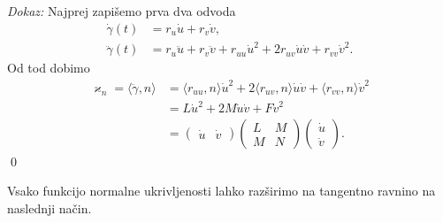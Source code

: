 \noindent
{\em Dokaz:\/}
 Najprej zapišemo prva dva odvoda 
 \begin{align*}
     \dot{\gamma}(t) &= r_u \dot{u} + r_v \dot{v}, \\
     \ddot{\gamma}(t) &=  r_u \ddot{u}+  r_v \ddot{v}+ r_{uu} \dot{u}^2 + 2r_{uv} \dot{u} \dot{v} + r_{vv} \dot{v}^2   .
 \end{align*}
Od tod dobimo 
\begin{align*}
    \varkappa_n = \langle \ddot{\gamma}, n \rangle  &= \langle r_{uu}, n \rangle \dot{u}^2 + 2  \langle r_{uv}, n \rangle \dot{u} \dot{v} + \langle r_{vv}, n \rangle  \dot{v}^2 \\
     &= L \dot{u}^2 + 2M \dot{u} \dot{v} + F \dot{v}^2 \\
     &= \begin{pmatrix}
        \dot{u} & \dot{v} 
      \end{pmatrix}
      \begin{pmatrix}
        L & M \\
        M & N
      \end{pmatrix}  
      \begin{pmatrix}
        \dot{u} \\
        \dot{v} 
      \end{pmatrix}.
\end{align*}
\qed

Vsako funkcijo normalne ukrivljenosti lahko razširimo na tangentno ravnino na naslednji način.

